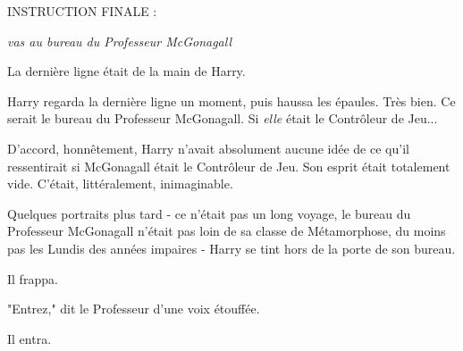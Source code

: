 \begin{center}INSTRUCTION FINALE :\end{center}



\begin{center}\emph{vas au bureau du Professeur McGonagall} \end{center}


La dernière ligne était de la main de Harry.

Harry regarda la dernière ligne un moment, puis haussa les épaules. Très bien. Ce serait le bureau du Professeur McGonagall. Si \emph{elle}  était le Contrôleur de Jeu...

D'accord, honnêtement, Harry n'avait absolument aucune idée de ce qu'il ressentirait si McGonagall était le Contrôleur de Jeu. Son esprit était totalement vide. C'était, littéralement, inimaginable.

Quelques portraits plus tard - ce n'était pas un long voyage, le bureau du Professeur McGonagall n'était pas loin de sa classe de Métamorphose, du moins pas les Lundis des années impaires - Harry se tint hors de la porte de son bureau.

Il frappa.

"Entrez," dit le Professeur d'une voix étouffée.

Il entra.

